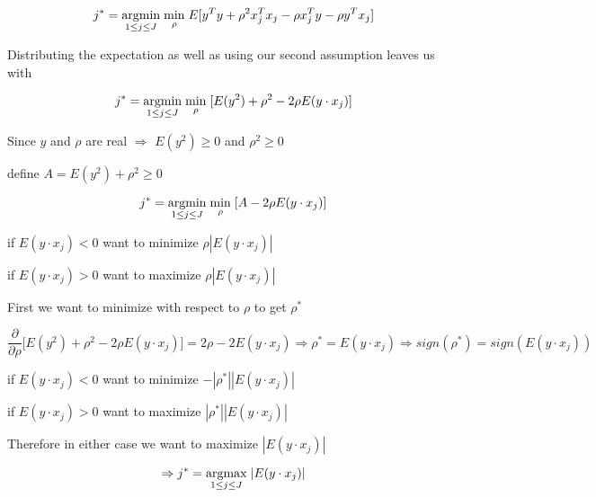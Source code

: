 \documentclass[11pt]{article}
\begin{document}
$$j^* = \underset{1 \leq j \leq J}{\operatorname{argmin}} \hspace{1mm} \underset{\rho}{\operatorname{min}} \hspace{1mm} E[y^Ty + \rho^2 x_j^T x_j - \rho x_j^T y - \rho y^T x_j]$$ 

Distributing the expectation as well as using our second assumption leaves us with

$$j^* = \underset{1 \leq j \leq J}{\operatorname{argmin}} \hspace{1mm} \underset{\rho}{\operatorname{min}} \hspace{1mm} [E(y^2) + \rho^2 - 2 \rho E(y \cdot x_j)]$$

Since $y$ and $\rho$ are real $\Rightarrow$ $E(y^2) \geq 0$ and $\rho^2 \geq 0$ 

define $A = E(y^2) + \rho^2 \geq 0$

$$j^* = \underset{1 \leq j \leq J}{\operatorname{argmin}} \hspace{1mm} \underset{\rho}{\operatorname{min}} \hspace{1mm} [A - 2 \rho E(y \cdot x_j)]$$

if $E(y \cdot x_j) < 0$ want to minimize $\rho |E(y \cdot x_j)|$ 

if $E(y \cdot x_j) > 0$ want to maximize $\rho |E(y \cdot x_j)|$ 

First we want to minimize with respect to $\rho$ to get $\rho^*$

$$\frac{\partial}{\partial \rho} \bigg[ E(y^2) + \rho^2 - 2 \rho E(y \cdot x_j) \bigg] = 2 \rho - 2 E(y \cdot x_j) \Rightarrow \rho^* = E(y \cdot x_j) \Rightarrow sign(\rho^*) = sign(E(y \cdot x_j))$$ 

if $E(y \cdot x_j) < 0$ want to minimize $- |\rho^*| |E(y \cdot x_j)|$

if $E(y \cdot x_j) > 0$ want to maximize $ |\rho^*| |E(y \cdot x_j)|$

Therefore in either case we want to maximize $|E(y \cdot x_j)|$

$$ \Rightarrow j^* = \underset{1 \leq j \leq J}{\operatorname{argmax}}\hspace{1mm} |E(y \cdot x_j)|$$
\end{document}
